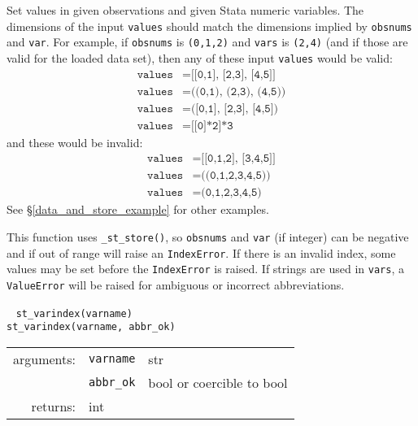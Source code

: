 \documentclass{article}
\begin{document}
			\vspace{1.5mm}
			\noindent Set values in given observations and given Stata numeric variables. The dimensions of the input \lstinline{values} should match the dimensions implied by \lstinline{obsnums} and \lstinline{var}. For example, if \lstinline{obsnums} is \lstinline{(0,1,2)} and \lstinline{vars} is \lstinline{(2,4)} (and if those are valid for the loaded data set), then any of these input \lstinline{values} would be valid:
			\begin{align*}
				\texttt{values} &= \texttt{[[0,1], [2,3], [4,5]]} \\
				\texttt{values} &= \texttt{((0,1), (2,3), (4,5))} \\
				\texttt{values} &= \texttt{([0,1], [2,3], [4,5])} \\
				\texttt{values} &= \texttt{[[0]*2]*3}
			\end{align*}
			and these would be invalid:
			\begin{align*}
				\texttt{values} &= \texttt{[[0,1,2], [3,4,5]]} \\
				\texttt{values} &= \texttt{((0,1,2,3,4,5))} \\
				\texttt{values} &= \texttt{(0,1,2,3,4,5)}
			\end{align*}
See \S\ref{data_and_store_example} for other examples. 
			
			This function uses \lstinline{_st_store()}, so \lstinline{obsnums} and \lstinline{var} (if integer) can be negative and if out of range will raise an \lstinline{IndexError}. If there is an invalid index, some values may be set before the \lstinline{IndexError} is raised. If strings are used in \lstinline{vars}, a \lstinline{ValueError} will be raised for ambiguous or incorrect abbreviations. \newline
			
			
			\ \newline
			\noindent \lstinline$st_varindex(varname)$ \\
			\noindent \lstinline$st_varindex(varname, abbr_ok)$
								
			\vspace{1.5mm}
			\noindent			
			\indent \begin{tabular}{rrl}
					arguments: & \texttt{varname} & str \\
					  & \texttt{abbr\_ok} & bool or coercible to bool \\
					returns: & \multicolumn{2}{l}{int}
				\end{tabular}
								
\end{document}
